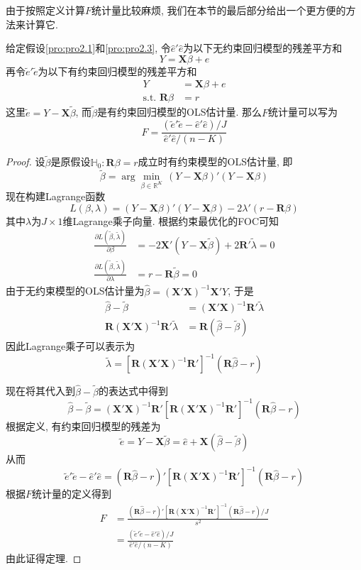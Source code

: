\documentclass[cn, 12pt, math=mtpro2, bibstyle=apa, blue, twocol]{elegantbook}
\newcommand{\R}{\mathbb{R}}
\newcommand{\RH}{\mathbold{R}}
\newcommand{\X}{\mathbold{X}}
\newcommand{\hb}{\hat{\beta}}
\newcommand{\HH}{\mathbb{H}}
\begin{document}
由于按照定义计算$F$统计量比较麻烦, 我们在本节的最后部分给出一个更方便的方法来计算它.
\begin{theorem}
  给定假设\ref{pro:pro2.1}和\ref{pro:pro2.3}, 令$\hat{e}'\hat{e}$为以下无约束回归模型的残差平方和
  $$Y=\X\beta+e$$
  再令$\tilde{e}'\tilde{e}$为以下有约束回归模型的残差平方和
  \begin{align*}
  Y&=\X\beta+e \\
  \text{s.t. }\RH\beta&=r
  \end{align*}
  这里$\tilde{e}=Y-\X\tilde{\beta}$, 而$\tilde{\beta}$是有约束回归模型的OLS估计量. 那么$F$统计量可以写为
  $$F=\frac{(\tilde{e}'\tilde{e}-\hat{e}'\hat{e})/J}{\hat{e}'\hat{e}/(n-K)}$$
\end{theorem}
\begin{proof}
  设$\tilde{\beta}$是原假设$\HH_0:\RH\beta=r$成立时有约束模型的OLS估计量, 即
  $$\tilde{\beta}=\arg\min_{\beta\in\R^K}\,(Y-\X\beta)'(Y-\X\beta)$$
  现在构建Lagrange函数
  $$L(\beta,\lambda)=(Y-\X\beta)'(Y-\X\beta)-2\lambda'(r-\RH\beta)$$
  其中$\lambda$为$J\times1$维Lagrange乘子向量. 根据约束最优化的FOC可知
  \begin{align*}
  \frac{\partial L(\tilde{\beta},\tilde{\lambda})}{\partial\beta}&=-2\X'(Y-\X\tilde{\beta})+2\RH'\tilde{\lambda}=0 \\
  \frac{\partial L(\tilde{\beta},\tilde{\lambda})}{\partial\lambda}&=r-\RH\tilde{\beta}=0
  \end{align*}
  由于无约束模型的OLS估计量为$\hb=(\X'\X)^{-1}\X'Y$, 于是
  \begin{align*}
  \hat{\beta}-\tilde{\beta}&=(\X'\X)^{-1}\RH'\tilde{\lambda} \\
  \RH(\X'\X)^{-1}\RH'\tilde{\lambda}&=\RH(\hb-\tilde{\beta})
  \end{align*}
  因此Lagrange乘子可以表示为
  $$\tilde{\lambda}=[\RH(\X'\X)^{-1}\RH']^{-1}(\RH\hb-r)$$

  现在将其代入到$\hb-\tilde{\beta}$的表达式中得到
  $$\hb-\tilde{\beta}=(\X'\X)^{-1}\RH'[\RH(\X'\X)^{-1}\RH']^{-1}(\RH\hb-r)$$
  根据定义, 有约束回归模型的残差为
  $$\tilde{e}=Y-\X\tilde{\beta}=\hat{e}+\X(\hb-\tilde{\beta})$$
  从而
  $$\tilde{e}'\tilde{e}-\hat{e}'\hat{e}=(\RH\hb-r)'[\RH(\X'\X)^{-1}\RH']^{-1}(\RH\hb-r)$$
  根据$F$统计量的定义得到
  \begin{align*}
  F&=\frac{(\RH\hb-r)'[\RH(\X'\X)^{-1}\RH']^{-1}(\RH\hb-r)/J}{s^2} \\
  &=\frac{(\tilde{e}'\tilde{e}-\hat{e}'\hat{e})/J}{\hat{e}'\hat{e}/(n-K)}
  \end{align*}
  由此证得定理.
  \end{proof}
\end{document}
